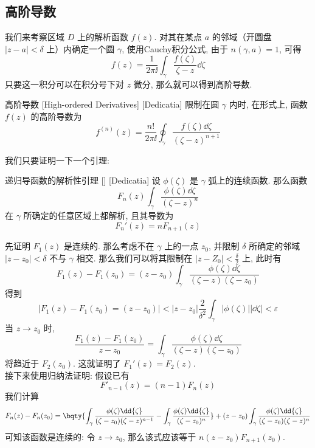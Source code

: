 \documentclass[UTF8]{ctexart}
\begin{document}
    \subsection{高阶导数}

        我们来考察区域 \(D\) 上的解析函数 \(f(z)\). 对其在某点 \(a\) 的邻域（开圆盘 \(|z-a|<\delta\) 上）内确定一个圆 \(\gamma\), 使用Cauchy积分公式, 由于 \(n(\gamma,a)=1\), 可得
        \[f(z)=\frac{1}{2\pi\ii}\int_\gamma\frac{f(\zeta)}{\zeta-z}\dd{\zeta}\]
        只要这一积分可以在积分号下对 \(z\) 微分, 那么就可以得到高阶导数. 

        \begin{dfn}
            [HighOrderedDerivative]
            {高阶导数}
            [High-ordered Derivatives]
            [Dedicatia]
            限制在圆 \(\gamma\) 内时, 在形式上, 函数 \(f(z)\) 的高阶导数为
            \[f^{(n)}(z)=\frac{n!}{2\pi\ii}\oint_\gamma\frac{f(\zeta)\dd{\zeta}}{(\zeta-z)^{n+1}}\]
        \end{dfn}

        我们只要证明一下一个引理: 

        \begin{lma}
            [UUID]
            {递归导函数的解析性引理}
            []
            [Dedicatia]
            设 \(\phi(\zeta)\) 是 \(\gamma\) 弧上的连续函数. 那么函数
            \[F_n(z)\int_\gamma \frac{\phi(\zeta)\dd{\zeta}}{(\zeta-z)^n}\]
            在 \(\gamma\) 所确定的任意区域上都解析, 且其导数为
            \[F_n'(z)=nF_{n+1}(z)\]
        \end{lma}

        \begin{prf}
            先证明 \(F_1(z)\) 是连续的. 那么考虑不在 \(\gamma\) 上的一点 \(z_0\), 并限制 \(\delta\) 所确定的邻域 \(|z-z_0|<\delta\) 不与 \(\gamma\) 相交. 那么我们可以将其限制在 \(|z-Z_0|<\frac{\delta}{2}\) 上, 此时有
            \[F_1(z)-F_1(z_0)=(z-z_0)\int_\gamma\frac{\phi(\zeta)\dd{\zeta}}{(\zeta-z)(\zeta-z_0)}\]
            得到
            \[|F_1(z)-F_1(z_0)=(z-z_0)|<|z-z_0|\frac{2}{\delta^2}\int_\gamma|\phi(\zeta)||\dd{\zeta}|<\varepsilon\]
            当 \(z\to z_0\) 时, 
            \[\frac{F_1(z)-F_1(z_0)}{z-z_0}=\int_\gamma\frac{\phi(\zeta)\dd{\zeta}}{(\zeta-z)(\zeta-z_0)}\]
            将趋近于 \(F_2(z_0)\). 这就证明了 \(F_1'(z)=F_2(z) \).\\
            接下来使用归纳法证明: 假设已有
            \[F'_{n-1}(z)=(n-1)F_n(z)\]
            我们计算
            \[F_n(z)-F_n(z_0)=\bqty{\int_\gamma\frac{\phi(\zeta)\dd{\zeta}}{(\zeta-z_0)(\zeta-z)^{n-1}}-\int_\gamma\frac{\phi(\zeta)\dd{\zeta}}{(\zeta-z_0)^n}}+(z-z_0)\int_\gamma\frac{\phi(\zeta)\dd{\zeta}}{(\zeta-z_0)(\zeta-z)^{n}}\]
            可知该函数是连续的: 令 \(z\to z_0\), 那么该式应该等于 \(n(z-z_0)F_{n+1}(z_0)\).
        \end{prf}
\end{document}
